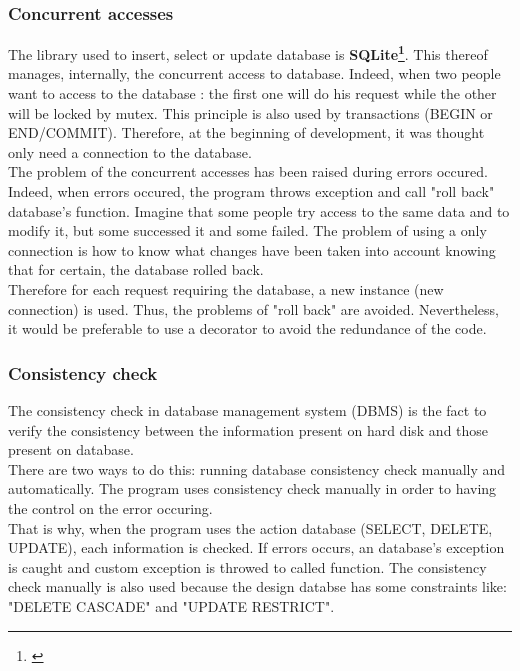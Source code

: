 \subsubsection{Concurrent accesses}
\setlength{\parindent}{1cm}
\hspace{1cm}
The library used to insert, select or update database is
\textbf{SQLite\footnote{\cite{SQLite}}}. This thereof manages, internally,
the concurrent access to database. Indeed, when two people want to
access to the database : the first one will do his request while
the other will be locked by mutex. This principle is also used by transactions
(BEGIN or END/COMMIT).
Therefore, at the beginning of development, it was thought only need a
connection to the database.\\
The problem of the concurrent accesses has been raised during errors occured.
Indeed, when errors occured, the program throws exception and call "roll back"
database's function. Imagine that some people try access to the same data and to
modify it, but some successed it and some failed. The problem of using a only
connection is how to know what changes have been taken into account knowing
that for certain, the database rolled back.\\
Therefore for each request requiring the database,
a new instance (new connection) is used. Thus, the problems
of "roll back" are avoided. Nevertheless, it would be preferable to use a decorator
to avoid the redundance of the code.

\subsubsection{Consistency check}

The consistency check in database management system (DBMS) is the fact
to verify the consistency between the information present on hard disk and
those present on database.\\
There are two ways to do this: running database consistency check manually and
automatically. The program uses consistency check manually in order to
having the control on the error occuring.\\
That is why, when the program uses the action database (SELECT, DELETE, UPDATE),
each information is checked. If errors occurs, an database's exception is caught
and custom exception is throwed to called function.
The consistency check manually is also used because the design databse
has some constraints like: "DELETE CASCADE" and "UPDATE RESTRICT".

